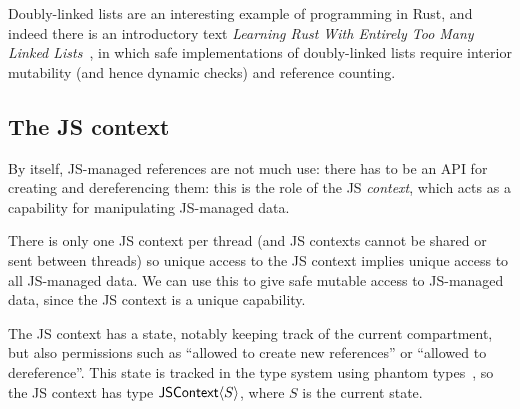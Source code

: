Doubly-linked lists are an interesting example of programming in Rust,
and indeed there is an introductory text \emph{Learning Rust With
  Entirely Too Many Linked Lists}~\cite{too-many-lists}, in which safe
implementations of doubly-linked lists require interior mutability
(and hence dynamic checks) and reference counting.

\subsection{The JS context}

By itself, JS-managed references are not much use: there has to be an
API for creating and dereferencing them: this is the role of the
JS \emph{context}, which acts as a capability for manipulating
JS-managed data.

There is only one JS context per thread (and JS contexts cannot be shared
or sent between threads) so unique access to the JS context implies unique
access to all JS-managed data. We can use this to give safe mutable access
to JS-managed data, since the JS context is a unique capability.

The JS context has a state, notably keeping track of the current
compartment, but also permissions such as ``allowed to create new
references'' or ``allowed to dereference''.  This state is tracked in
the type system using phantom types~\cite{phantom}, so the JS context
has type $\mathsf{JSContext}\langle S\rangle$, where $S$ is the current state.

